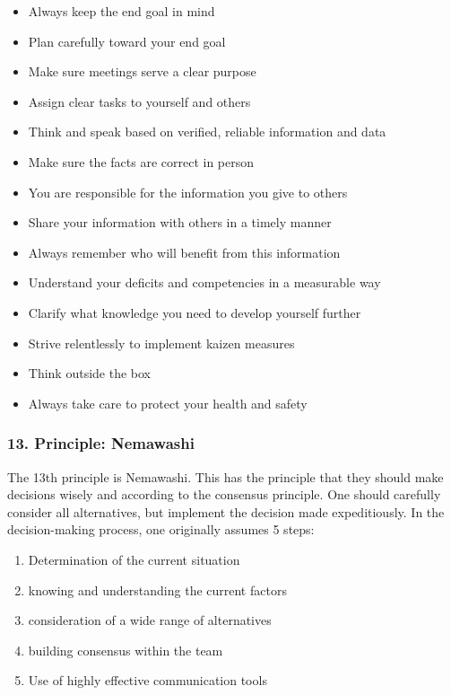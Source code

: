 \documentclass[a4paper,12pt]{scrartcl}
\begin{document}
\begin{itemize}
    \item Always keep the end goal in mind
    \item Plan carefully toward your end goal
    \item Make sure meetings serve a clear purpose
    \item Assign clear tasks to yourself and others
    \item Think and speak based on verified, reliable information and data
    \item Make sure the facts are correct in person
    \item You are responsible for the information you give to others
    \item Share your information with others in a timely manner
    \item Always remember who will benefit from this information
    \item Understand your deficits and competencies in a measurable way
    \item Clarify what knowledge you need to develop yourself further
    \item Strive relentlessly to implement kaizen measures
    \item Think outside the box
    \item Always take care to protect your health and safety
\end{itemize}

\subsubsection{13. Principle: Nemawashi}

The 13th principle is Nemawashi. This has the principle that they should make decisions wisely and according to the consensus principle. One should carefully consider all alternatives, but implement the decision made expeditiously. In the decision-making process, one originally assumes 5 steps:

\begin{enumerate}
    \item Determination of the current situation
    \item knowing and understanding the current factors
    \item consideration of a wide range of alternatives
    \item building consensus within the team
    \item Use of highly effective communication tools
\end{enumerate}
\end{document}
